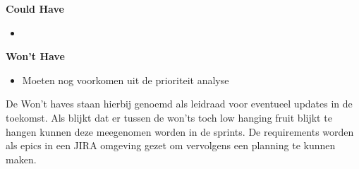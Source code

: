 \textbf{Could Have}
\begin{itemize}
    \item
\end{itemize}

\textbf{Won't Have}
\begin{itemize}
    \item Moeten nog voorkomen uit de prioriteit analyse
\end{itemize}
De Won't haves staan hierbij genoemd als leidraad voor eventueel updates in de toekomst.
Als blijkt dat er tussen de won'ts toch low hanging fruit blijkt te hangen kunnen deze meegenomen worden in de sprints.
De requirements worden als epics in een JIRA omgeving gezet om vervolgens een planning te kunnen maken.


